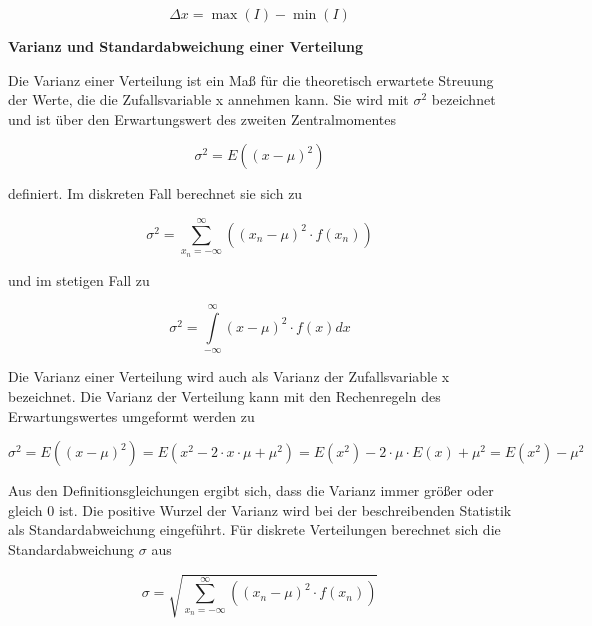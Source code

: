 \begin{equation}\label{eq:fourfiftyone}
\Delta x=\max (I)-\min (I)
\end{equation}

{\selectfont
\noindent\textbf{Varianz und Standardabweichung einer Verteilung}}\smallskip

\noindent Die Varianz einer Verteilung ist ein Ma{\ss} f\"{u}r die theoretisch erwartete Streuung der Werte, die die Zufallsvariable x annehmen kann. Sie wird mit $\sigma^{2}$ bezeichnet und ist \"{u}ber den Erwartungswert des zweiten Zentralmomentes 

\begin{equation}\label{eq:fourfiftytwo}
\sigma ^{2} =E\left((x-\mu)^{2} \right)
\end{equation}

\noindent definiert. Im diskreten Fall berechnet sie sich zu

\begin{equation}\label{eq:fourfiftythree}
\sigma ^{2} =\sum _{x_{n} =-\infty }^{\infty }\left((x_{n} -\mu)^{2} \cdot f(x_{n})\right)
\end{equation}

\noindent und im stetigen Fall zu

\begin{equation}\label{eq:fourfiftyfour}
\sigma ^{2} =\int\limits _{-\infty }^{\infty }\left(x-\mu \right)^{2} \cdot f(x)dx
\end{equation}

\noindent Die Varianz einer Verteilung wird auch als Varianz der Zufallsvariable x bezeichnet. Die Varianz der Verteilung kann mit den Rechenregeln des Erwartungswertes umgeformt werden zu

\begin{equation}\label{eq:fourfiftyfive}
\sigma ^{2} =E\left((x-\mu)^{2} \right)=E\left(x^{2} -2\cdot x\cdot \mu +\mu ^{2} \right)=E(x^{2})-2\cdot \mu \cdot E(x)+\mu ^{2} =E(x^{2})-\mu ^{2}
\end{equation}

\noindent Aus den Definitionsgleichungen ergibt sich, dass die Varianz immer gr\"{o}{\ss}er oder gleich 0 ist. Die positive Wurzel der Varianz wird bei der beschreibenden Statistik als Standardabweichung eingef\"{u}hrt. F\"{u}r diskrete Verteilungen berechnet sich die Standardabweichung $\sigma$ aus 

\begin{equation}\label{eq:fourfiftysix}
\sigma =\sqrt{\sum _{x_{n} =-\infty }^{\infty }\left((x_{n} -\mu)^{2} \cdot f(x_{n})\right)}
\end{equation}

